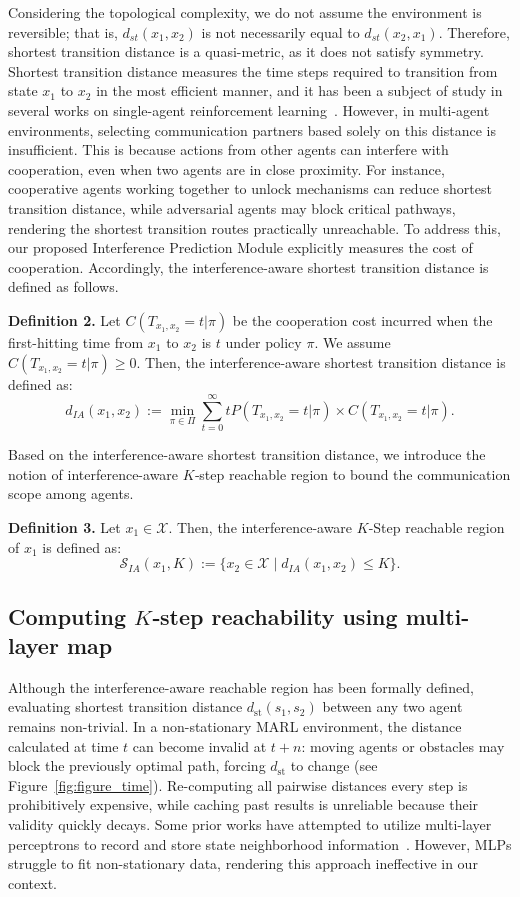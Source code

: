 \documentclass[10pt]{article} %
\begin{document}
Considering the topological complexity, we do not assume the environment is reversible; that is, \(d_{st}(x_1, x_2)\) is not necessarily equal to \(d_{st}(x_2, x_1)\). Therefore, shortest transition distance is a quasi-metric, as it does not satisfy symmetry.
Shortest transition distance measures the time steps required to transition from state \(x_1\) to \(x_2\) in the most efficient manner, and it has been a subject of study in several works on single-agent reinforcement learning~\citep{chebotarev2020hitting,zhang2020generating}. However, in multi-agent environments, selecting communication partners based solely on this distance is insufficient. This is because actions from other agents can interfere with cooperation, even when two agents are in close proximity. For instance, cooperative agents working together to unlock mechanisms can reduce shortest transition distance, while adversarial agents may block critical pathways, rendering the shortest transition routes practically unreachable. To address this, our proposed Interference Prediction Module explicitly measures the cost of cooperation. Accordingly, the interference-aware shortest transition distance is defined as follows.

\textbf{Definition 2.} Let \(C(T_{x_1,x_2}=t|\pi)\) be the cooperation cost incurred when the first-hitting time from \(x_1\) to \(x_2\) is \(t\) under policy \(\pi\). We assume \(C(T_{x_1,x_2}=t|\pi)\ge 0\). Then, the interference-aware shortest transition distance is defined as:
\[
d_{IA}(x_1, x_2) := \min_{\pi \in \Pi} \sum_{t=0}^{\infty} t P(T_{x_1,x_2}=t|\pi) \times C(T_{x_1,x_2}=t|\pi).
\]

Based on the interference-aware shortest transition distance, we introduce the notion of interference-aware $K$‑step reachable region to bound the communication scope among agents.

\textbf{Definition 3.} Let \(x_1 \in \mathcal{X}\). Then, the interference-aware $K$-Step reachable region of \(x_1\) is defined as:
\[
\mathcal{S}_{IA}(x_1, K) := \{x_2 \in \mathcal{X} \mid d_{IA}(x_1, x_2) \le K\}.
\]

\subsection{Computing $K$‑step reachability using multi-layer map}

Although the interference-aware reachable region has been formally defined, evaluating shortest transition distance $d_{\text{st}}(s_1,s_2)$ between any two agent remains non-trivial. In a non-stationary MARL environment, the distance calculated at time $t$ can become invalid at $t\!+\!n$: moving agents or obstacles may block the previously optimal path, forcing $d_{\text{st}}$ to change (see Figure~\ref{fig:figure_time}). Re-computing all pairwise distances every step is prohibitively expensive, while caching past results is unreliable because their validity quickly decays. Some prior works have attempted to utilize multi-layer perceptrons to record and store state neighborhood information~\citep{paraskevopoulos2017finding}. However, MLPs struggle to fit non-stationary data, rendering this approach ineffective in our context.
\end{document}
